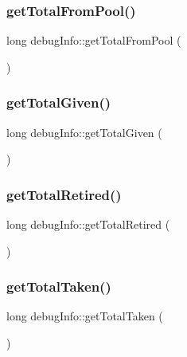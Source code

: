 \subsubsection{\texorpdfstring{get\+Total\+From\+Pool()}{getTotalFromPool()}}
{\footnotesize\ttfamily long debug\+Info\+::get\+Total\+From\+Pool (\begin{DoxyParamCaption}{ }\end{DoxyParamCaption})\hspace{0.3cm}{\ttfamily [inline]}}

\mbox{\label{classdebugInfo_ae8908c770a611a4b8745165eb47ab413}} 
\subsubsection{\texorpdfstring{get\+Total\+Given()}{getTotalGiven()}}
{\footnotesize\ttfamily long debug\+Info\+::get\+Total\+Given (\begin{DoxyParamCaption}{ }\end{DoxyParamCaption})\hspace{0.3cm}{\ttfamily [inline]}}

\mbox{\label{classdebugInfo_a430da54baa14a5ffce57ec72b2c9213e}} 
\subsubsection{\texorpdfstring{get\+Total\+Retired()}{getTotalRetired()}}
{\footnotesize\ttfamily long debug\+Info\+::get\+Total\+Retired (\begin{DoxyParamCaption}{ }\end{DoxyParamCaption})\hspace{0.3cm}{\ttfamily [inline]}}

\mbox{\label{classdebugInfo_ad91984dff0e13832b541275397810802}} 
\subsubsection{\texorpdfstring{get\+Total\+Taken()}{getTotalTaken()}}
{\footnotesize\ttfamily long debug\+Info\+::get\+Total\+Taken (\begin{DoxyParamCaption}{ }\end{DoxyParamCaption})\hspace{0.3cm}{\ttfamily [inline]}}

